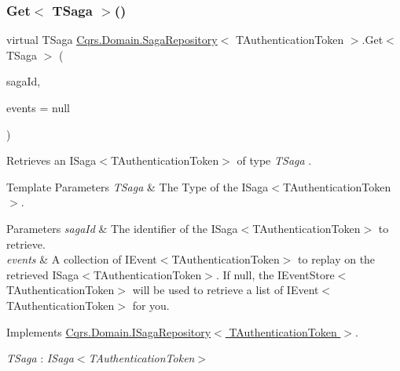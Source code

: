 \subsubsection{\texorpdfstring{Get$<$ T\+Saga $>$()}{Get< TSaga >()}}
{\footnotesize\ttfamily virtual T\+Saga \hyperlink{classCqrs_1_1Domain_1_1SagaRepository}{Cqrs.\+Domain.\+Saga\+Repository}$<$ T\+Authentication\+Token $>$.Get$<$ T\+Saga $>$ (\begin{DoxyParamCaption}\item[{Guid}]{saga\+Id,  }\item[{I\+List$<$ \hyperlink{interfaceCqrs_1_1Events_1_1ISagaEvent}{I\+Saga\+Event}$<$ T\+Authentication\+Token $>$$>$}]{events = {\ttfamily null} }\end{DoxyParamCaption})\hspace{0.3cm}{\ttfamily [virtual]}}



Retrieves an I\+Saga$<$\+T\+Authentication\+Token$>$ of type {\itshape T\+Saga} . 


\begin{DoxyTemplParams}{Template Parameters}
{\em T\+Saga} & The Type of the I\+Saga$<$\+T\+Authentication\+Token$>$.\\
\hline
\end{DoxyTemplParams}

\begin{DoxyParams}{Parameters}
{\em saga\+Id} & The identifier of the I\+Saga$<$\+T\+Authentication\+Token$>$ to retrieve.\\
\hline
{\em events} & A collection of I\+Event$<$\+T\+Authentication\+Token$>$ to replay on the retrieved I\+Saga$<$\+T\+Authentication\+Token$>$. If null, the I\+Event\+Store$<$\+T\+Authentication\+Token$>$ will be used to retrieve a list of I\+Event$<$\+T\+Authentication\+Token$>$ for you. \\
\hline
\end{DoxyParams}


Implements \hyperlink{interfaceCqrs_1_1Domain_1_1ISagaRepository_aa3409bf59bbe489afcc89716928e9ad1_aa3409bf59bbe489afcc89716928e9ad1}{Cqrs.\+Domain.\+I\+Saga\+Repository$<$ T\+Authentication\+Token $>$}.

\begin{Desc}
\item[Type Constraints]\begin{description}
\item[{\em T\+Saga} : {\em I\+Saga$<$T\+Authentication\+Token$>$}]\end{description}
\end{Desc}
\mbox{\label{classCqrs_1_1Domain_1_1SagaRepository_acc59a4478bb992b03690f0cda3e4e362_acc59a4478bb992b03690f0cda3e4e362}} 

